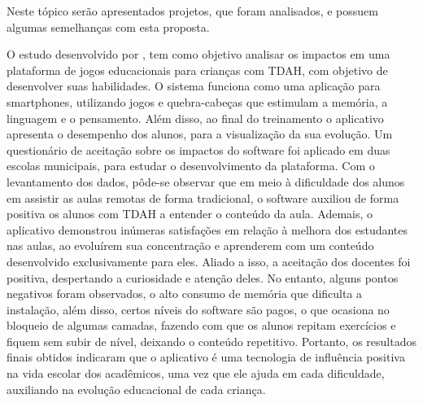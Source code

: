 Neste tópico serão apresentados projetos, que foram analisados, e possuem algumas semelhanças com esta proposta.

O estudo desenvolvido por \cite{Santos2020}, tem como objetivo analisar os impactos em uma plataforma de jogos educacionais para crianças com TDAH, com objetivo de desenvolver suas habilidades.  O sistema funciona como uma aplicação para smartphones, utilizando jogos e quebra-cabeças que estimulam a memória, a linguagem e o pensamento. Além disso, ao final do treinamento o aplicativo apresenta o desempenho dos alunos, para a visualização da sua evolução. Um questionário de aceitação sobre os impactos do software foi aplicado em duas escolas municipais, para estudar o desenvolvimento da plataforma. Com o levantamento dos dados, pôde-se observar que em meio à dificuldade dos alunos em assistir as aulas remotas de forma tradicional, o software auxiliou de forma positiva os alunos com TDAH a entender o conteúdo da aula. Ademais, o aplicativo demonstrou inúmeras satisfações em relação à melhora dos estudantes nas aulas, ao evoluírem sua concentração e aprenderem com um conteúdo desenvolvido exclusivamente para eles. Aliado a isso, a aceitação dos docentes foi positiva, despertando a curiosidade e atenção deles. No entanto, alguns pontos negativos foram observados, o alto consumo de memória que dificulta a instalação, além disso, certos níveis do software são pagos, o que ocasiona no bloqueio de algumas camadas, fazendo com que os alunos repitam exercícios e fiquem sem subir de nível, deixando o conteúdo repetitivo. Portanto, os resultados finais obtidos indicaram que o aplicativo é uma tecnologia de influência positiva na vida escolar dos acadêmicos, uma vez que ele ajuda em cada dificuldade, auxiliando na evolução educacional de cada criança.


